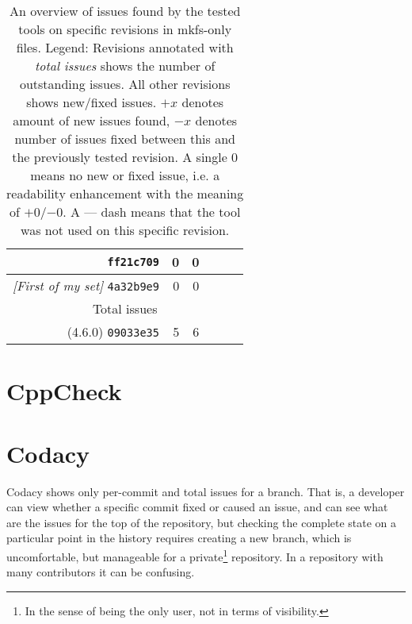 \begin{table}[h]
\begin{tabular}{|r||r|r|r|r|r|}
\hline
{\tt ff21c709} & 0 & 0 & & & \\
\hline
{\em [First of my set]} {\tt 4a32b9e9} & 0 & 0 & & & \\
\hline
\hline
\multicolumn{6}{|c|}{Total issues} \\
\hline
(4.6.0) {\tt 09033e35} & 5 & 6 & & & \\
\hline
\end{tabular}
\caption{An overview of issues found by the tested tools on specific
	revisions in mkfs-only files.\newline
	\newline
	Legend: Revisions annotated with {\em total issues} shows the
	number of outstanding issues. All other revisions shows new/fixed
	issues.  $+x$ denotes amount of new issues found, $-x$ denotes
	number of issues fixed between this and the previously tested
revision. A single 0 means no new or fixed issue, i.e. a readability
enhancement with the meaning of $+0$/$-0$. A --- dash means that the tool
was not used on this specific revision.}


\label{tab:results:overview}
\end{table}

\section{CppCheck}\label{chap:results:cppcheck}



\section{Codacy}\label{chap:results:codacy}
Codacy shows only per-commit and total issues for a branch. That is, a
developer can view whether a specific commit fixed or caused an issue, and
can see what are the issues for the top of the repository, but checking the
complete state on a particular point in the history requires creating a new
branch, which is uncomfortable, but manageable for a private\footnote{In
the sense of being the only user, not in terms of visibility.} repository.
In a repository with many contributors it can be confusing.


